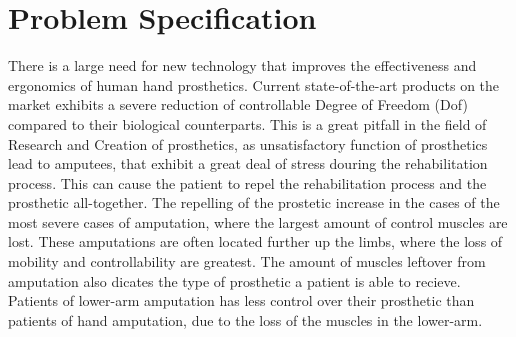 \documentclass[../main.tex]{subfiles}
\begin{document}
\section{Problem Specification}

There is a large need for new technology that improves the effectiveness and ergonomics of human hand prosthetics.
Current state-of-the-art products on the market exhibits a severe reduction of controllable Degree of Freedom (Dof) compared to their biological counterparts.
This is a great pitfall in the field of Research and Creation of prosthetics, as unsatisfactory function of prosthetics lead to amputees, that exhibit a great deal of stress douring the rehabilitation process.
This can cause the patient to repel the rehabilitation process and the prosthetic all-together.
The repelling of the prostetic increase in the cases of the most severe cases of amputation, where the largest amount of control muscles are lost.
These amputations are often located further up the limbs, where the loss of mobility and controllability are greatest.
The amount of muscles leftover from amputation also dicates the type of prosthetic a patient is able to recieve.
Patients of lower-arm amputation has less control over their prosthetic than patients of hand amputation, due to the loss of the muscles in the lower-arm.
\end{document}
